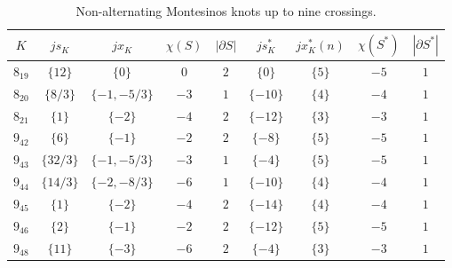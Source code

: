 \documentclass[11pt]{amsart}
\theoremstyle{definition}
\begin{document}
\begin{table}[]
\begin{center}
\begin{tabular}{|c|c|c|c|c|c|c|c|c|}
\hline
$K$& $js_K$ & $jx_{K}$ & $\chi(S)$ & $|\partial{S}|$ & $js^*_K$ & $jx_K^*(n)$ & $\chi(S^*)$ & $|\partial{S^*}|$\\
\hline
$8_{19}$ & $\{12\}$ &   $\{0\}$ & $0$ & $2$ & $\{0\}$ & $\{5\}$ & $-5$ & $1$ \\
\hline
$8_{20}$ &$\{ 8/3\}$  &$\{-1, -5/3\}$  & $-3$ & $1$ & $\{-10\}$& $\{4\}$ &$-4$ &$1$\\
\hline
$8_{21}$ & $\{1\}$ &  $\{-2\}$ & $-4$ & $2$ & $\{-12\}$ & $\{3\}$ &$-3$ &$1$\\
\hline
$9_{42}$  & $\{6\}$ &  $\{-1\}$ & $-2$ & $2$ & $\{-8\}$ & $\{5\}$ &$-5$ &$1$\\
\hline
$9_{43}$  & $\{ 32/3\}$ &  $\{-1, -5/3\}$ & $-3$& $1$ & $\{-4\}$& $\{5\}$ &$-5$ &$1$\\
\hline
$9_{44}$ & $\{ 14/3\}$ & $\{-2, -8/3\}$  &$-6$ &$1$ & $\{-10\}$ & $\{4\}$ &$-4$ &$1$\\
\hline
$9_{45}$  & $\{ 1\}$ &  $\{-2\}$ &$-4$ &$2$ & $\{-14\}$& $\{4\}$ &$-4$&$1$\\
\hline
$9_{46}$  & $\{ 2\}$ &  $\{-1\}$ &$-2$ &$2$& $\{-12\}$ & $\{5\}$ &$-5$&$1$\\
\hline
$9_{48}$ & $\{11\}$ &  $\{-3\}$ &$-6$ & $2$ &$\{-4\}$& $\{3\}$ &$-3$&$1$\\
\hline
 \end{tabular}
\vskip 0.3in 
\caption{Non-alternating Montesinos knots up to nine crossings.}
\end{center}
\end{table}
\end{document}
